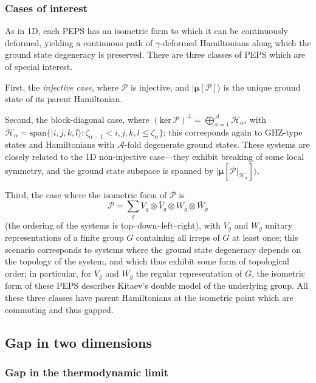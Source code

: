 \documentclass[twocolumn,superscriptaddress,prb,linenumbers]{revtex4-1}
\newcommand{\ket}[1]{\vert#1\rangle}
\newcommand{\MPS}[1]{| {\bm\mu}[#1]\rangle}
\newcommand{\mc}[1]{\mathcal{#1}}
\begin{document}
\subsubsection{Cases of interest}

As in 1D, each PEPS has an isometric form to which it can be continuously
deformed, yielding a continuous path of $\gamma$-deformed Hamiltonians
along which the ground state degeneracy is preserved.
There are three
classes of PEPS which are of special interest.

First, the
\emph{injective case}, where $\mathcal P$ is injective,
and $\MPS{\mc P}$ is the unique ground state of its parent
Hamiltonian.\cite{perez-garcia:parent-ham-2d}

Second, the block-diagonal case, where $(\mathrm{ker}\:\mc
    P)^\perp=\bigoplus_{\alpha=1}^{\mc A} \mc H_\alpha$, with $\mc H_\alpha =
    \mathrm{span}\{\ket{i,j,k,l}: \zeta_{\alpha-1}<i,j,k,l\le \zeta_\alpha\}$;
this corresponds again to GHZ-type states and Hamiltonians with $\mc
    A$-fold degenerate ground states.  These systems are closely related to
the 1D non-injective case---they exhibit breaking of some local symmetry,
and the ground state subspace is spanned by $\MPS{\mc P\vert_{\mc
            H_\alpha}}$.

Third, the case where the isometric
form of $\mc P$ is
\begin{equation}
    \label{eq:topo-proj}
    \mc P=\sum_g V_g\otimes \bar V_g\otimes W_g \otimes \bar W_g
\end{equation}
(the ordering of the systems is top--down--left--right),
with $V_g$ and $W_g$ unitary representations of a finite group $G$ containing all
irreps of $G$ at least once; this scenario corresponds to systems where
the ground state degeneracy depends on the topology of the system, and
which thus exhibit some form of topological order;\cite{schuch:peps-sym}
in particular, for $V_g$ and $W_g$ the regular representation of $G$,
the isometric form of these PEPS describes Kitaev's double model of the
underlying group.\cite{kitaev:toriccode} All these three classes have
parent Hamiltonians at the isometric point which are commuting and thus
gapped.

\subsection{\label{sec:2d-gap}
    Gap in two dimensions}

\subsubsection{Gap in the thermodynamic limit}
\end{document}
